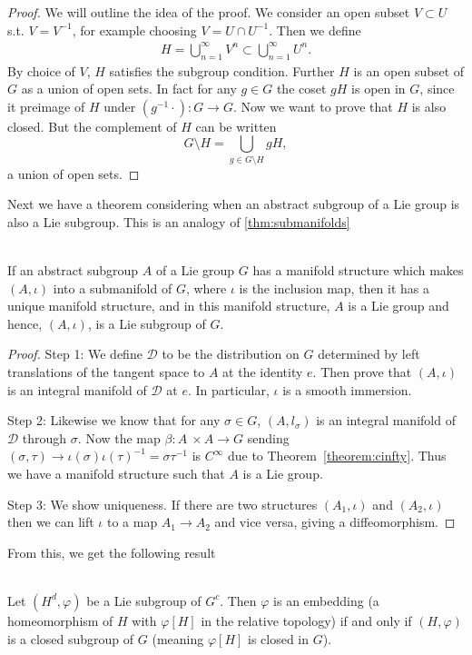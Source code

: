 \begin{proof}
We will outline the idea of the proof. We consider an open subset $V \subset U$ s.t. $V=V^{-1}$, for example choosing $V = U\cap U^{-1}$. Then we define 
\begin{align*}
H = \bigcup_{n=1}^{\infty} V^n \subset \bigcup_{n=1}^{\infty} U^n.
\end{align*}
By choice of $V$, $H$ satisfies the subgroup condition. Further $H$ is an open subset of $G$ as a union of open sets. In fact for any $g \in G$ the coset $gH$ is open in $G$, since it preimage of $H$ under $(g^{-1} \cdot) : G \to G$.
Now we want to prove that $H$ is also closed. But the complement of $H$ can be written
\[
G \setminus H = \bigcup_{g \in G \setminus H} gH,
\]
a union of open sets.
\end{proof}
Next we have a theorem considering when an abstract subgroup of a Lie group is also a Lie subgroup. This is an analogy of \ref{thm:submanifolds}
\begin{theorem}
\textup{\cite[3.20]{Warner1983}}\\
If an abstract subgroup $A$ of a Lie group $G$ has a manifold structure which makes $(A, \iota)$ into a submanifold of $G$, where $\iota$ is the inclusion map, then it has a unique manifold structure, and in this manifold structure, $A$ is a Lie group and hence, $(A, \iota)$, is a Lie subgroup of $G$.
\end{theorem}

\begin{proof}
Step 1: 
We define $\mathcal{D}$ to be the distribution on $G$ determined by left translations of the tangent space to $A$ at the identity $e$. 
Then prove that $(A,\iota)$ is an integral manifold of $\mathcal{D}$ at $e$. 
In particular, $\iota$ is a smooth immersion.

Step 2:
Likewise we know that for any $\sigma \in G$, $(A,l_{\sigma})$ is an integral manifold of $\mathcal{D}$ through $\sigma$. 
Now the map $\beta \colon A\ \times A \to G$ sending $(\sigma,\tau) \to \iota(\sigma)\iota(\tau)^{-1} = \sigma\tau^{-1}$ is $C^{\infty}$ due to Theorem~\ref{theorem:cinfty}.
Thus we have a manifold structure such that $A$ is a Lie group.

Step 3:
We show uniqueness.
If there are two structures $(A_1,\iota)$ and $(A_2,\iota)$ then we can lift $\iota$ to a map $A_1 \to A_2$ and vice versa, giving a diffeomorphism.
\end{proof}
From this, we get the following result
\begin{theorem}
\textup{\cite[3.21]{Warner1983}}\\
Let $(H^d,\varphi)$ be a Lie subgroup of $G^c$. Then $\varphi$ is an embedding (a homeomorphism of $H$ with $\varphi[H]$ in the relative topology) if and only if $(H,\varphi)$ is a closed subgroup of $G$ (meaning $\varphi[H]$ is closed in $G$).
\end{theorem}

